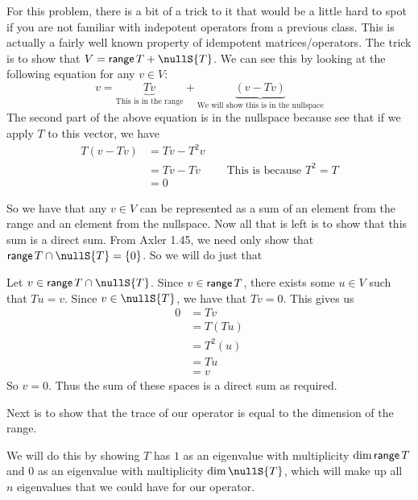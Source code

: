\documentclass[answers]{exam}
\begin{document}
\begin{questions}
\begin{parts}
\begin{solution}
            For this problem, there is a bit of a trick to it that would be a little hard to spot if you are not
            familiar with indepotent operators from a previous class. This is actually a fairly well known 
            property of idempotent matrices/operators. The trick is to show
            that $V = \range{T} + \nullS{T}$. We can see this by looking at the following
            equation for any $v\in V$:
            \[
                v = \underbrace{Tv}_{\text{This is in the range}} + \underbrace{(v - Tv)}_{\text{We will show this
                is in the nullspace}}
            \]
            The second part of the above equation is in the nullspace because see that if we apply $T$ to this
            vector, we have
            \begin{align*}
                T(v-Tv) &= Tv - T^2v \\
                &= Tv - Tv \qquad\text{ This is because $T^2 = T$}\\
                &= 0
            \end{align*}

            So we have that any $v\in V$ can be represented as a sum of an element from the range and an element
            from the nullspace. Now all that is left is to show that this sum is a direct sum. From Axler 1.45, we
            need only show that $\range{T}\cap\nullS{T} = \{0\}$. So we will do just that

            Let $v\in \range{T}\cap\nullS{T}$. Since $v\in\mathsf{range}\,{T}$, there exists some $u\in V$ such that 
            $Tu = v$. Since $v\in\nullS{T}$, we have that $Tv = 0$. This gives us
            \begin{align*}
                0 &= Tv \\
                &= T(Tu) \\
                &= T^2(u) \\
                &= Tu \\
                &= v
            \end{align*}
            So $v=0$. Thus the sum of these spaces is a direct sum as required.

            Next is to show that the trace of our operator is equal to the dimension of the range.

            We will do this by showing $T$ has $1$ as an eigenvalue with multiplicity $\text{dim}\,{\mathsf{range}\,{T}}$ and
            $0$ as an eigenvalue with multiplicity $\dim{\nullS{T}}$, which will make up all $n$ eigenvalues 
            that we could have for our operator.


\end{solution}
\end{parts}
\end{questions}
\end{document}
